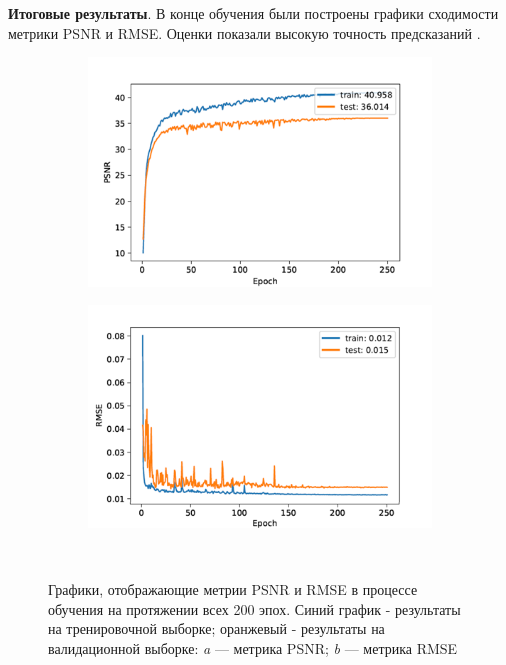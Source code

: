 \textbf{Итоговые результаты}.
В конце обучения были построены графики сходимости метрики PSNR и RMSE. Оценки показали высокую точность предсказаний .

\begin{figure}[H]
	\begin{subfigure}[t]{\dimexpr.5\linewidth-1.3em\relax}
		\centering
		\includegraphics[width=.95\linewidth,valign=t]{my_folder/images/denoising/psnr_training.png}
	\end{subfigure}
	\hfill %
	\begin{subfigure}[t]{\dimexpr.5\linewidth-1.3em\relax}
		\centering
		\includegraphics[width=.95\linewidth,valign=t]{my_folder/images/denoising/rmse_training.png}
	\end{subfigure}
	\\[20pt]
	\captionsetup{justification=centering} %
	\caption{Графики, отображающие метрии PSNR и RMSE в процессе обучения на протяжении всех 200 эпох. Синий график - результаты на тренировочной выборке; оранжевый - результаты на валидационной выборке: {\itshape a} --- метрика PSNR; {\itshape b} --- метрика RMSE} 
	\label{fig:denoising-training-metrics}
\end{figure}

